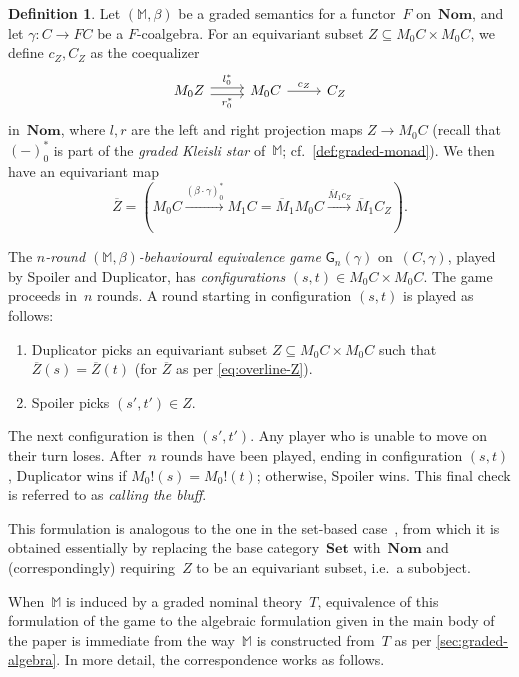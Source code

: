 \documentclass[11pt,a4paper]{amsart}
\newcommand{\game}{\mathsf{G}}
\newcommand{\mbar}{\overline{M}_1}
\theoremstyle{plain}
\numberwithin{equation}{section}
\newcommand{\monad}{{\mathbb{M}}}
\newcommand{\Set}{\mathbf{Set}}
\newcommand{\+}[1]{\mathcal{#1}\xspace}
\newcommand{\Nom}{\mathbf{Nom}}
\theoremstyle{definition}
\newtheorem{defn}[defn]{Definition}
\begin{document}
\begin{defn}\label{def:game}
  Let $(\monad,\beta)$ be a graded semantics for a functor~$F$
  on~$\Nom$, and let $\gamma\colon C\to FC$ be a $F$-coalgebra. For an
  equivariant subset $Z\subseteq M_0C\times M_0C$, we define $c_Z,C_Z$
  as the coequalizer
  \begin{equation*}
    \begin{tikzcd}
      M_0Z\arrow[r,"l_0^*",shift left]\arrow[r,"r_0^*" below,shift right]
      & M_0C \arrow[r,"c_Z"] & C_Z
    \end{tikzcd}
  \end{equation*}
  in~$\Nom$, where $l,r$ are the left and right projection maps
  $Z\to M_0C$ (recall that~$(-)_0^*$ is part of the \emph{graded
    Kleisli star} of~$\monad$; cf.~\cref{def:graded-monad}). We then
  have an equivariant map
  \begin{equation}\label{eq:overline-Z}
    \overline Z =(M_0 C \xrightarrow{(\beta\cdot\gamma)_0^*}M_1C=\mbar M_0C\xrightarrow{\mbar c_Z}\mbar C_Z).
  \end{equation}

  The \emph{$n$-round $(\monad,\beta)$-behavioural equivalence game}
  $\game_n(\gamma)$ on~$(C,\gamma)$, played by Spoiler  and
  Duplicator, has \emph{configurations}
  $(s,t)\in M_0C\times M_0C$. The game proceeds in~$n$ rounds. A round
  starting in configuration $(s,t)$ is played as follows:
  \begin{enumerate}
  \item Duplicator picks an equivariant subset
    $Z\subseteq M_0C\times M_0C$ such that
    $\overline Z(s)=\overline Z(t)$ (for $\overline Z$ as per
    \eqref{eq:overline-Z}).
  \item Spoiler picks $(s',t')\in Z$.
  \end{enumerate}
  The next configuration is then $(s',t')$. Any player who is unable
  to move on their turn loses. After~$n$ rounds have been played,
  ending in configuration $(s,t)$, Duplicator wins if
  $M_0!(s)=M_0!(t)$; otherwise, Spoiler wins. This final
  check is referred to as \emph{calling the bluff}.
\end{defn}
This formulation is analogous to the one in the set-based
case~\cite{FordEA22}, from which it is obtained essentially by
replacing the base category~$\Set$ with~$\Nom$ and (correspondingly)
requiring~$Z$ to be an equivariant subset, i.e.\ a subobject.

When~$\monad$ is induced by a graded nominal theory~$T$, equivalence
of this formulation of the game to the algebraic formulation given in
the main body of the paper is immediate from the way~$\monad$ is
constructed from~$T$ as per \cref{sec:graded-algebra}. In more detail,
the correspondence works as follows. 
\end{document}
